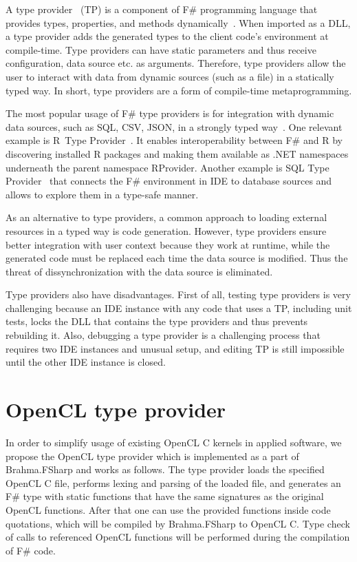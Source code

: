 \documentclass[sigplan]{acmart}\settopmatter{}
\begin{document}
A type provider~\cite{syme2012strongly} (TP) is a component of F\# programming language that provides types, properties, and methods dynamically~\cite{TypeProviders}. When imported as a DLL, a type provider adds the generated types to the client code's environment at compile-time. Type providers can have static parameters and thus receive configuration, data source etc. as arguments. Therefore, type providers allow the user to interact with data from dynamic sources (such as a file) in a statically typed way. In short, type providers are a form of compile-time metaprogramming.

The most popular usage of F\# type providers is for integration with dynamic data sources, such as SQL, CSV, JSON, in a strongly typed way~\cite{FSharpData}. One relevant example is R~Type Provider~\cite{R_TP}. It enables interoperability between F\# and R by discovering installed R packages and making them available as .NET namespaces underneath the parent namespace RProvider. Another example is SQL Type Provider~\cite{SQL_TP} that connects the F\# environment in IDE to database sources and allows to explore them in a type-safe manner.

As an alternative to type providers, a common approach to loading external resources in a typed way is code generation. However, type providers ensure better integration with user context because they work at runtime, while the generated code must be replaced each time the data source is modified. Thus the threat of dissynchronization with the data source is eliminated.

Type providers also have disadvantages. First of all, testing type providers is very challenging because an IDE instance with any code that uses a TP, including unit tests, locks the DLL that contains the type providers and thus prevents rebuilding it. Also, debugging a type provider is a challenging process that requires two IDE instances and unusual setup, and editing TP is still impossible until the other IDE instance is closed.

\section{OpenCL type provider}

In order to simplify usage of existing OpenCL C kernels in applied software, we propose the OpenCL type provider which is implemented as a part of Brahma.FSharp and works as follows. 
The type provider loads the specified OpenCL C file, performs lexing and parsing of the loaded file, and generates an F\# type with static functions that have the same signatures as the original OpenCL functions.
After that one can use the provided functions inside code quotations, which will be compiled by Brahma.FSharp to OpenCL C. Type check of calls to referenced OpenCL functions will be performed during the compilation of F\# code.
\end{document}
